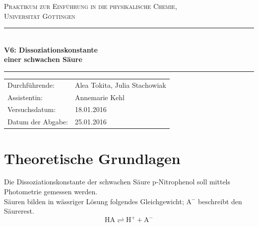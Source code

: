 \documentclass[12pt,a4paper,titlepage,headinclude,bibtotoc]{scrartcl}
\begin{document}
\begin{titlepage}
\centering
\textsc{\Large Praktikum zur Einführung in die physikalische Chemie,\\[1.5ex] Universität Göttingen}

\vspace*{1cm}

\rule{\textwidth}{1pt}\\[0.5cm]
{\huge \bfseries
  V6: Dissoziationskonstante\\[1.5ex]
  einer schwachen Säure}\\[0.5cm]
\rule{\textwidth}{1pt}

\vspace*{3cm}


\begin{Large}
\begin{tabular}{ll}
Durchführende: &  Alea Tokita, Julia Stachowiak\\
Assistentin: & Annemarie Kehl\\
 Versuchsdatum: & 18.01.2016\\
 Datum der Abgabe: & 25.01.2016\\
\end{tabular}
\end{Large}

\vspace*{1cm}

\begin{Large}
\end{Large}

\end{titlepage}

\tableofcontents

\newpage

\section{Theoretische Grundlagen}

Die Dissoziationskonstante der schwachen Säure p-Nitrophenol soll mittels Photometrie gemessen werden. \\
Säuren bilden in wässriger Lösung folgendes Gleichgewicht; $\mathrm{A^-}$ beschreibt den Säurerest.\\

\begin{equation}
\mathrm{HA}  \rightleftharpoons \mathrm{H^+} + \mathrm{A^-}
\end{equation}
\end{document}
